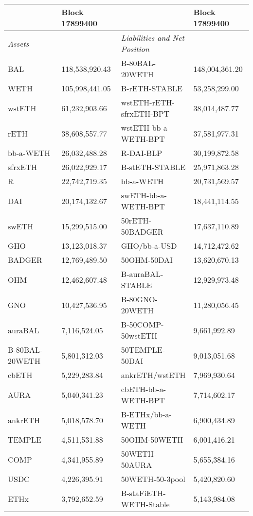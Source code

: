 
\begin{longtable}{@{}p{0.25\linewidth}p{0.25\linewidth}p{0.25\linewidth}p{0.25\linewidth}@{}}

\toprule


& Block 17899400 & & Block 17899400 \\

\midrule
\textit{Assets} & & \textit{Liabilities and Net Position} \\
BAL & 118,538,920.43 & B-80BAL-20WETH & 148,004,361.20 \\
WETH & 105,998,441.05 & B-rETH-STABLE & 53,258,299.00 \\
wstETH & 61,232,903.66 & wstETH-rETH-sfrxETH-BPT & 38,014,487.77 \\
rETH & 38,608,557.77 & wstETH-bb-a-WETH-BPT & 37,581,977.31 \\
bb-a-WETH & 26,032,488.28 & R-DAI-BLP & 30,199,872.58 \\
sfrxETH & 26,022,929.17 & B-stETH-STABLE & 25,971,863.28 \\
R & 22,742,719.35 & bb-a-WETH & 20,731,569.57 \\
DAI & 20,174,132.67 & swETH-bb-a-WETH-BPT & 18,441,114.55 \\
swETH & 15,299,515.00 & 50rETH-50BADGER & 17,637,110.89 \\
GHO & 13,123,018.37 & GHO/bb-a-USD & 14,712,472.62 \\
BADGER & 12,769,489.50 & 50OHM-50DAI & 13,620,670.13 \\
OHM & 12,462,607.48 & B-auraBAL-STABLE & 12,929,973.48 \\
GNO & 10,427,536.95 & B-80GNO-20WETH & 11,280,056.45 \\
auraBAL & 7,116,524.05 & B-50COMP-50wstETH & 9,661,992.89 \\
B-80BAL-20WETH & 5,801,312.03 & 50TEMPLE-50DAI & 9,013,051.68 \\
cbETH & 5,229,283.84 & ankrETH/wstETH & 7,969,930.64 \\
AURA & 5,040,341.23 & cbETH-bb-a-WETH-BPT & 7,714,602.17 \\
ankrETH & 5,018,578.70 & B-ETHx/bb-a-WETH  & 6,900,434.89 \\
TEMPLE & 4,511,531.88 & 50OHM-50WETH & 6,001,416.21 \\
COMP & 4,341,955.89 & 50WETH-50AURA & 5,655,384.16 \\
USDC & 4,226,395.91 & 50WETH-50-3pool & 5,420,820.60 \\
ETHx & 3,792,652.59 & B-staFiETH-WETH-Stable & 5,143,984.08 \\

\end{longtable}
